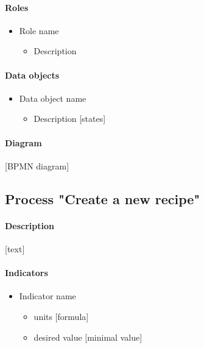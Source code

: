 \documentclass[11pt,a4paper]{article}
\begin{document}
\paragraph{Roles}

\begin{itemize}
    \item Role name
    \begin{itemize}
        \item Description
    \end{itemize}
\end{itemize}

\paragraph{Data objects}

\begin{itemize}
    \item Data object name
    \begin{itemize}
        \item Description [states]
    \end{itemize}
\end{itemize}

\paragraph{Diagram}

[BPMN diagram]

\subsection{Process "Create a new recipe"}

\paragraph{Description}

[text]

\paragraph{Indicators}

\begin{itemize}
    \item Indicator name
    \begin{itemize}
        \item units [formula]
        \item desired value [minimal value]
    \end{itemize}
\end{itemize}
\end{document}
